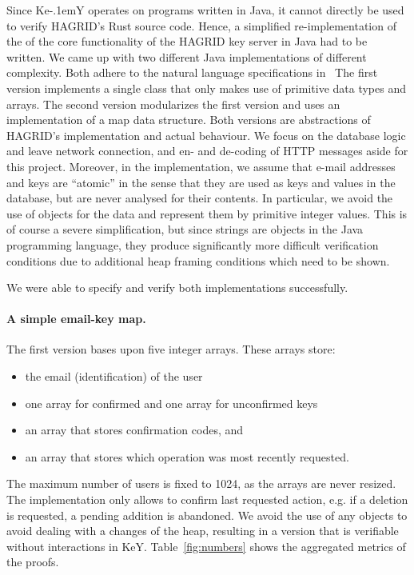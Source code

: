 \documentclass{llncs}
\newcommand{\KeY}{Ke\kern-.1emY\xspace}
\begin{document}
Since \KeY operates on programs written in Java, it cannot directly be
used to verify HAGRID's Rust source code. Hence, a simplified
re-implementation of the of the core functionality of the HAGRID key
server in Java had to be written.
%
We came up with two different Java implementations of different
complexity.
%
Both adhere to the natural language specifications in~\cite{LTC-dok}
%
The first version implements a single class that only
makes use of primitive data types and arrays. The second version
modularizes the first version and uses an implementation of a map data
structure. Both versions are abstractions of HAGRID's implementation
and actual behaviour. We focus on the database logic and leave network
connection, and en- and de-coding of HTTP messages aside for this
project. 
%
Moreover, in the implementation, we assume that e-mail addresses and
keys are ``atomic'' in the sense that they are used as keys and values
in the database, but are never analysed for their contents. In
particular, we avoid the use of objects for the data and represent
them by primitive integer values.
%
This is of course a severe simplification, but since strings are
objects in the Java programming language, they produce significantly
more difficult verification conditions due to additional heap framing
conditions which need to be shown.

We were able to specify and verify both implementations successfully.

\paragraph{A simple email-key map.}
%
The first version bases upon five integer arrays.
These arrays store:
%
\begin{itemize}
  \item the email (identification) of the user
  \item one array for confirmed and one array for unconfirmed keys
  \item an array that stores confirmation codes, and
  \item an array that stores which operation was most recently requested.
\end{itemize}
%
The maximum number of users is fixed to 1024, as the arrays are never resized.
The implementation only allows to confirm last requested action, e.g. if a
deletion is requested, a pending addition is abandoned.
%
We avoid the use of any objects to avoid dealing with a changes of the heap,
resulting in a version that is verifiable without interactions in KeY. 
Table~\ref{fig:numbers} shows the aggregated metrics of the proofs.
\end{document}
